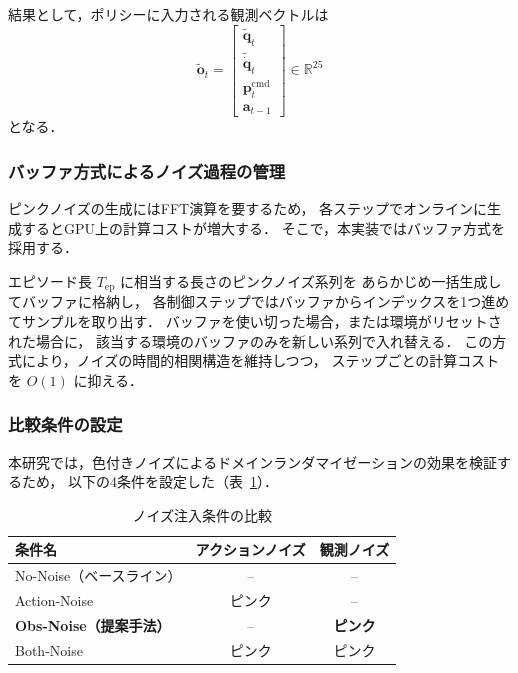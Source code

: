 結果として，ポリシーに入力される観測ベクトルは
\begin{equation}
  \tilde{\boldsymbol{o}}_t =
  \begin{bmatrix}
    \tilde{\boldsymbol{q}}_t \\
    \tilde{\dot{\boldsymbol{q}}}_t \\
    \boldsymbol{p}_t^{\mathrm{cmd}} \\
    \boldsymbol{a}_{t-1}
  \end{bmatrix}
  \in \mathbb{R}^{25}
  \label{eq:corrupted_obs}
\end{equation}
となる．

\subsubsection{バッファ方式によるノイズ過程の管理}

ピンクノイズの生成にはFFT演算を要するため，
各ステップでオンラインに生成するとGPU上の計算コストが増大する．
そこで，本実装ではバッファ方式を採用する．

エピソード長 $T_{\mathrm{ep}}$ に相当する長さのピンクノイズ系列を
あらかじめ一括生成してバッファに格納し，
各制御ステップではバッファからインデックスを1つ進めてサンプルを取り出す．
バッファを使い切った場合，または環境がリセットされた場合に，
該当する環境のバッファのみを新しい系列で入れ替える．
この方式により，ノイズの時間的相関構造を維持しつつ，
ステップごとの計算コストを $O(1)$ に抑える．

\subsubsection{比較条件の設定}

本研究では，色付きノイズによるドメインランダマイゼーションの効果を検証するため，
以下の4条件を設定した（表~\ref{tab:noise_conditions}）．

\begin{table}[htbp]
  \centering
  \caption{ノイズ注入条件の比較}
  \label{tab:noise_conditions}
  \begin{tabular}{lcc}
    \toprule
    条件名 & アクションノイズ & 観測ノイズ \\
    \midrule
    No-Noise（ベースライン）   & -- & -- \\
    Action-Noise     & ピンク & -- \\
    \textbf{Obs-Noise（提案手法）} & -- & \textbf{ピンク} \\
    Both-Noise       & ピンク & ピンク \\
    \bottomrule
  \end{tabular}
\end{table}

